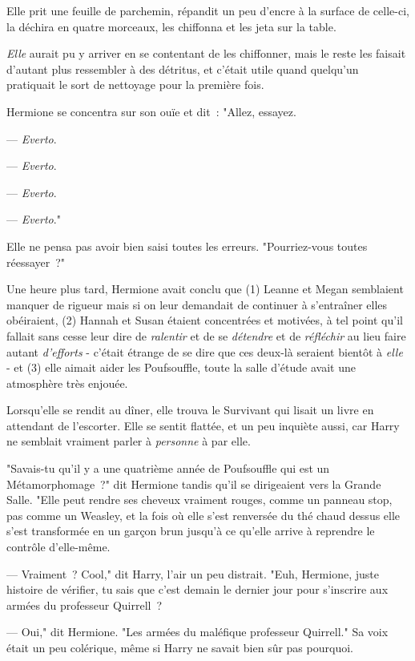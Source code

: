 Elle prit une feuille de parchemin, répandit un peu d'encre à la surface de celle-ci, la déchira en quatre morceaux, les chiffonna et les jeta sur la table.

\emph{Elle} aurait pu y arriver en se contentant de les chiffonner, mais le reste les faisait d'autant plus ressembler à des détritus, et c'était utile quand quelqu'un pratiquait le sort de nettoyage pour la première fois.

Hermione se concentra sur son ouïe et dit~: "Allez, essayez.

--- \emph{Everto}.

--- \emph{Everto}.

--- \emph{Everto}.

--- \emph{Everto}."

Elle ne pensa pas avoir bien saisi toutes les erreurs. "Pourriez-vous toutes réessayer~?"

Une heure plus tard, Hermione avait conclu que (1) Leanne et Megan semblaient manquer de rigueur mais si on leur demandait de continuer à s'entraîner elles obéiraient, (2) Hannah et Susan étaient concentrées et motivées, à tel point qu'il fallait sans cesse leur dire de \emph{ralentir} et de se \emph{détendre} et de \emph{réfléchir} au lieu faire autant \emph{d'efforts} - c'était étrange de se dire que ces deux-là seraient bientôt à \emph{elle} - et (3) elle aimait aider les Poufsouffle, toute la salle d'étude avait une atmosphère très enjouée.

Lorsqu'elle se rendit au dîner, elle trouva le Survivant qui lisait un livre en attendant de l'escorter. Elle se sentit flattée, et un peu inquiète aussi, car Harry ne semblait vraiment parler à \emph{personne} à par elle.

"Savais-tu qu'il y a une quatrième année de Poufsouffle qui est un Métamorphomage~?" dit Hermione tandis qu'il se dirigeaient vers la Grande Salle. "Elle peut rendre ses cheveux vraiment rouges, comme un panneau stop, pas comme un Weasley, et la fois où elle s'est renversée du thé chaud dessus elle s'est transformée en un garçon brun jusqu'à ce qu'elle arrive à reprendre le contrôle d'elle-même.

--- Vraiment~? Cool," dit Harry, l'air un peu distrait. "Euh, Hermione, juste histoire de vérifier, tu sais que c'est demain le dernier jour pour s'inscrire aux armées du professeur Quirrell~?

--- Oui," dit Hermione. "Les armées du maléfique professeur Quirrell." Sa voix était un peu colérique, même si Harry ne savait bien sûr pas pourquoi.

